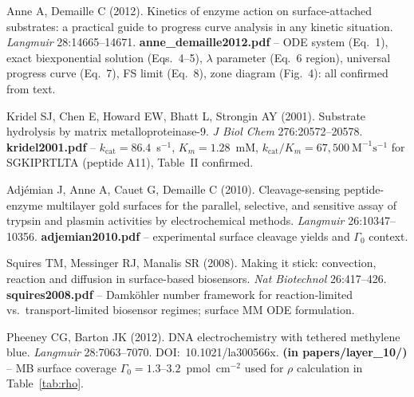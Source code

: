 \documentclass[10pt,a4paper]{article}
\numberwithin{equation}{section}
\newcommand{\Mms}{\text{M}^{-1}\text{s}^{-1}}
\newcommand{\kcat}{k_{\text{cat}}}
\newcommand{\Gz}{\Gamma_0}
\begin{document}
\begin{enumerate}[label={[\arabic*]},noitemsep,leftmargin=*]

\item Anne A, Demaille C (2012). Kinetics of enzyme action on surface-attached substrates:
  a practical guide to progress curve analysis in any kinetic situation.
  \textit{Langmuir} 28:14665--14671.
  \textbf{anne\_demaille2012.pdf} -- ODE system (Eq.~1), exact biexponential solution
  (Eqs.~4--5), $\lambda$ parameter (Eq.~6 region), universal progress curve (Eq.~7),
  FS limit (Eq.~8), zone diagram (Fig.~4): all confirmed from text.

\item Kridel SJ, Chen E, Howard EW, Bhatt L, Strongin AY (2001). Substrate hydrolysis
  by matrix metalloproteinase-9.
  \textit{J Biol Chem} 276:20572--20578.
  \textbf{kridel2001.pdf} -- $\kcat = 86.4$~s$^{-1}$, $K_m = 1.28$~mM,
  $\kcat/K_m = 67{,}500\ \Mms$ for SGKIPRTLTA (peptide A11), Table~II confirmed.

\item Adjémian J, Anne A, Cauet G, Demaille C (2010). Cleavage-sensing peptide-enzyme
  multilayer gold surfaces for the parallel, selective, and sensitive assay of trypsin
  and plasmin activities by electrochemical methods.
  \textit{Langmuir} 26:10347--10356.
  \textbf{adjemian2010.pdf} -- experimental surface cleavage yields and $\Gz$ context.

\item Squires TM, Messinger RJ, Manalis SR (2008). Making it stick: convection,
  reaction and diffusion in surface-based biosensors.
  \textit{Nat Biotechnol} 26:417--426.
  \textbf{squires2008.pdf} -- Damk\"{o}hler number framework for reaction-limited
  vs.\ transport-limited biosensor regimes; surface MM ODE formulation.

\item Pheeney CG, Barton JK (2012). DNA electrochemistry with tethered methylene blue.
  \textit{Langmuir} 28:7063--7070. DOI:~10.1021/la300566x.
  \textbf{(in papers/layer\_10/)} -- MB surface coverage
  $\Gz = 1.3$--$3.2$~pmol~cm$^{-2}$ used for $\rho$ calculation in
  Table~\ref{tab:rho}.

\end{enumerate}
\end{document}
